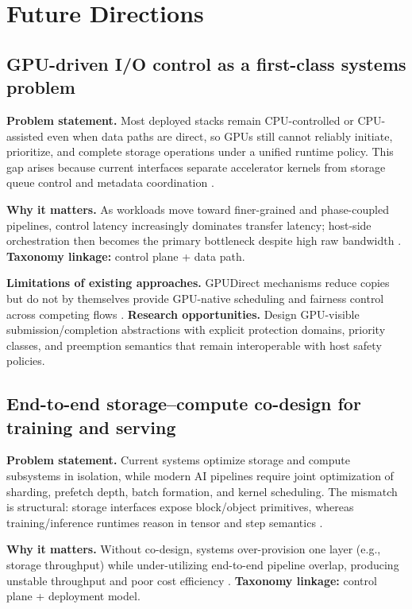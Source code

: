 \section{Future Directions}

\subsection{GPU-driven I/O control as a first-class systems problem}

\textbf{Problem statement.} Most deployed stacks remain CPU-controlled or CPU-assisted even when data paths are direct, so GPUs still cannot reliably initiate, prioritize, and complete storage operations under a unified runtime policy. This gap arises because current interfaces separate accelerator kernels from storage queue control and metadata coordination \cite{nvidia_gds_overview,nvidia_gdrdma,linux_io_uring}.

\textbf{Why it matters.} As workloads move toward finer-grained and phase-coupled pipelines, control latency increasingly dominates transfer latency; host-side orchestration then becomes the primary bottleneck despite high raw bandwidth \cite{murray2021tfdata,qureshi2023bam}. \textbf{Taxonomy linkage:} control plane + data path.

\textbf{Limitations of existing approaches.} GPUDirect mechanisms reduce copies but do not by themselves provide GPU-native scheduling and fairness control across competing flows \cite{nvidia_gds_blog,nvidia_gds_best_practices}. \textbf{Research opportunities.} Design GPU-visible submission/completion abstractions with explicit protection domains, priority classes, and preemption semantics that remain interoperable with host safety policies.

\subsection{End-to-end storage--compute co-design for training and serving}

\textbf{Problem statement.} Current systems optimize storage and compute subsystems in isolation, while modern AI pipelines require joint optimization of sharding, prefetch depth, batch formation, and kernel scheduling. The mismatch is structural: storage interfaces expose block/object primitives, whereas training/inference runtimes reason in tensor and step semantics \cite{murray2021tfdata,hoard2018,kwon2023vllm}.

\textbf{Why it matters.} Without co-design, systems over-provision one layer (e.g., storage throughput) while under-utilizing end-to-end pipeline overlap, producing unstable throughput and poor cost efficiency \cite{zhong2024distserve,rajbhandari2021zeroinfinity}. \textbf{Taxonomy linkage:} control plane + deployment model.

